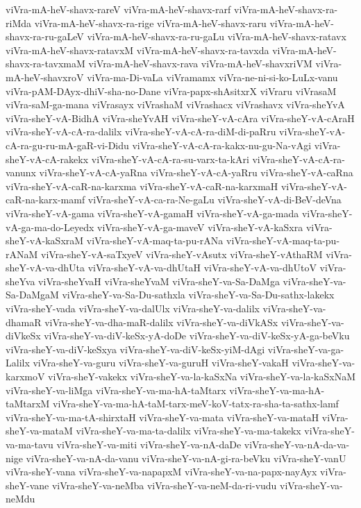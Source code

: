 {viVra-mA-heV-shavx-rareV
viVra-mA-heV-shavx-rarf
viVra-mA-heV-shavx-ra-riMda
viVra-mA-heV-shavx-ra-rige
viVra-mA-heV-shavx-raru
viVra-mA-heV-shavx-ra-ru-gaLeV
viVra-mA-heV-shavx-ra-ru-gaLu
viVra-mA-heV-shavx-ratavx
viVra-mA-heV-shavx-ratavxM
viVra-mA-heV-shavx-ra-tavxda
viVra-mA-heV-shavx-ra-tavxmaM
viVra-mA-heV-shavx-rava
viVra-mA-heV-shavxriVM
viVra-mA-heV-shavxroV
viVra-ma-Di-vaLa
viVramamx
viVra-ne-ni-si-ko-LuLx-vanu
viVra-pAM-DAyx-dhiV-sha-no-Dane
viVra-papx-shAsitxrX
viVraru
viVrasaM
viVra-saM-ga-mana
viVrasayx
viVrashaM
viVrashacx
viVrashavx
viVra-sheYvA
viVra-sheY-vA-BidhA
viVra-sheYvAH
viVra-sheY-vA-cAra
viVra-sheY-vA-cAraH
viVra-sheY-vA-cA-ra-dalilx
viVra-sheY-vA-cA-ra-diM-di-paRru
viVra-sheY-vA-cA-ra-gu-ru-mA-gaR-vi-Didu
viVra-sheY-vA-cA-ra-kakx-nu-gu-Na-vAgi
viVra-sheY-vA-cA-rakekx
viVra-sheY-vA-cA-ra-su-varx-ta-kAri
viVra-sheY-vA-cA-ra-vanunx
viVra-sheY-vA-cA-yaRna
viVra-sheY-vA-cA-yaRru
viVra-sheY-vA-caRna
viVra-sheY-vA-caR-na-karxma
viVra-sheY-vA-caR-na-karxmaH
viVra-sheY-vA-caR-na-karx-mamf
viVra-sheY-vA-ca-ra-Ne-gaLu
viVra-sheY-vA-di-BeV-deVna
viVra-sheY-vA-gama
viVra-sheY-vA-gamaH
viVra-sheY-vA-ga-mada
viVra-sheY-vA-ga-ma-do-Leyedx
viVra-sheY-vA-ga-maveV
viVra-sheY-vA-kaSxra
viVra-sheY-vA-kaSxraM
viVra-sheY-vA-maq-ta-pu-rANa
viVra-sheY-vA-maq-ta-pu-rANaM
viVra-sheY-vA-saTxyeV
viVra-sheY-vAsutx
viVra-sheY-vAthaRM
viVra-sheY-vA-va-dhUta
viVra-sheY-vA-va-dhUtaH
viVra-sheY-vA-va-dhUtoV
viVra-sheYva
viVra-sheYvaH
viVra-sheYvaM
viVra-sheY-va-Sa-DaMga
viVra-sheY-va-Sa-DaMgaM
viVra-sheY-va-Sa-Du-sathxla
viVra-sheY-va-Sa-Du-sathx-lakekx
viVra-sheY-vada
viVra-sheY-va-dalUlx
viVra-sheY-va-dalilx
viVra-sheY-va-dhamaR
viVra-sheY-va-dha-maR-dalilx
viVra-sheY-va-diVkASx
viVra-sheY-va-diVkeSx
viVra-sheY-va-diV-keSx-yA-doDe
viVra-sheY-va-diV-keSx-yA-ga-beVku
viVra-sheY-va-diV-keSxya
viVra-sheY-va-diV-keSx-yiM-dAgi
viVra-sheY-va-ga-Lalilx
viVra-sheY-va-guru
viVra-sheY-va-guruH
viVra-sheY-vakaH
viVra-sheY-va-karxmoV
viVra-sheY-vakekx
viVra-sheY-va-la-kaSxNa
viVra-sheY-va-la-kaSxNaM
viVra-sheY-va-liMga
viVra-sheY-va-ma-hA-taMtarx
viVra-sheY-va-ma-hA-taMtarxM
viVra-sheY-va-ma-hA-taM-tarx-meV-koV-tatx-ra-sha-ta-sathx-lamf
viVra-sheY-va-ma-tA-shirxtaH
viVra-sheY-va-mata
viVra-sheY-va-mataH
viVra-sheY-va-mataM
viVra-sheY-va-ma-ta-dalilx
viVra-sheY-va-ma-takekx
viVra-sheY-va-ma-tavu
viVra-sheY-va-miti
viVra-sheY-va-nA-daDe
viVra-sheY-va-nA-da-va-nige
viVra-sheY-va-nA-da-vanu
viVra-sheY-va-nA-gi-ra-beVku
viVra-sheY-vanU
viVra-sheY-vana
viVra-sheY-va-napapxM
viVra-sheY-va-na-papx-nayAyx
viVra-sheY-vane
viVra-sheY-va-neMba
viVra-sheY-va-neM-da-ri-vudu
viVra-sheY-va-neMdu
}
